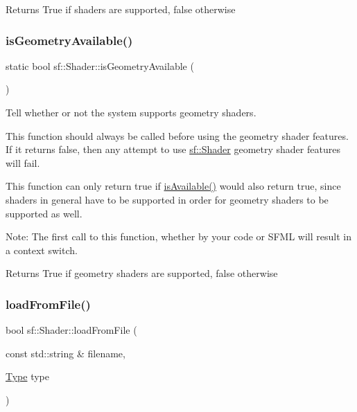 \begin{DoxyReturn}{Returns}
True if shaders are supported, false otherwise 
\end{DoxyReturn}
\mbox{\label{classsf_1_1_shader_a45db14baf1bbc688577f81813b1fce96}} 
\subsubsection{\texorpdfstring{is\+Geometry\+Available()}{isGeometryAvailable()}}
{\footnotesize\ttfamily static bool sf\+::\+Shader\+::is\+Geometry\+Available (\begin{DoxyParamCaption}{ }\end{DoxyParamCaption})\hspace{0.3cm}{\ttfamily [static]}}



Tell whether or not the system supports geometry shaders. 

This function should always be called before using the geometry shader features. If it returns false, then any attempt to use \hyperlink{classsf_1_1_shader}{sf\+::\+Shader} geometry shader features will fail.

This function can only return true if \hyperlink{classsf_1_1_shader_ad22474690bafe4a305c1b9826b1bd86a}{is\+Available()} would also return true, since shaders in general have to be supported in order for geometry shaders to be supported as well.

Note\+: The first call to this function, whether by your code or S\+F\+ML will result in a context switch.

\begin{DoxyReturn}{Returns}
True if geometry shaders are supported, false otherwise 
\end{DoxyReturn}
\mbox{\label{classsf_1_1_shader_a053a5632848ebaca2fcd8ba29abe9e6e}} 
\subsubsection{\texorpdfstring{load\+From\+File()}{loadFromFile()}\hspace{0.1cm}{\footnotesize\ttfamily [1/3]}}
{\footnotesize\ttfamily bool sf\+::\+Shader\+::load\+From\+File (\begin{DoxyParamCaption}\item[{const std\+::string \&}]{filename,  }\item[{\hyperlink{classsf_1_1_shader_afaa1aa65e5de37b74d047da9def9f9b3}{Type}}]{type }\end{DoxyParamCaption})}




